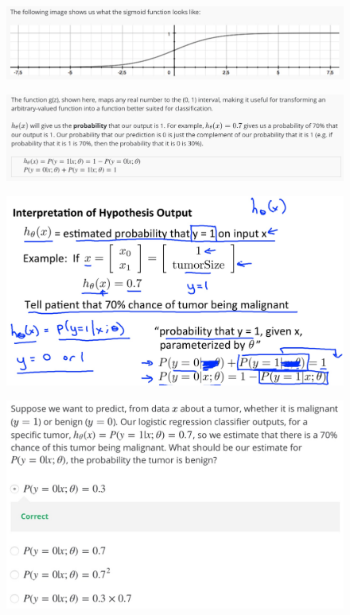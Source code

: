 \documentclass[12pt, A4,onecolumn]{article} %
\begin{document}
\begin{figure}[H]
	\centering
	\includegraphics[width=1\textwidth]{./Imagenes/hipoRep2}
\end{figure}

\begin{figure}[H]
	\centering
	\includegraphics[width=1\textwidth]{./Imagenes/hipoRep3}
\end{figure}

\begin{figure}[H]
	\centering
	\includegraphics[width=1\textwidth]{./Imagenes/hipoRep4}
\end{figure}
\begin{figure}[H]
	\centering
	\includegraphics[width=1\textwidth]{./Imagenes/testHipo}
\end{figure}
\newpage
\end{document}
